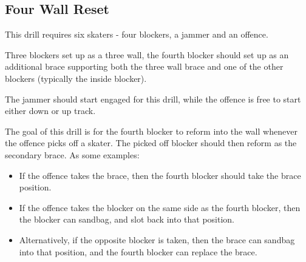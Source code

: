 \subsection*{Four Wall Reset}
\label{drill:four_wall/reset}

This drill requires six skaters - four blockers, a jammer and an offence.

Three blockers set up as a three wall, the fourth blocker should set up as an additional brace supporting both the three wall brace and one of the other blockers (typically the inside blocker).

The jammer should start engaged for this drill, while the offence is free to start either down or up track. 


The goal of this drill is for the fourth blocker to reform into the wall whenever the offence picks off a skater. The picked off blocker should then reform as the secondary brace.  
As some examples:

\begin{itemize}
    \item If the offence takes the brace, then the fourth blocker should take the brace position. 
    \item If the offence takes the blocker on the same side as the fourth blocker, then the blocker can sandbag, and slot back into that position. 
    \item Alternatively, if the opposite blocker is taken, then the brace can sandbag into that position, and the fourth blocker can replace the brace.
\end{itemize}


